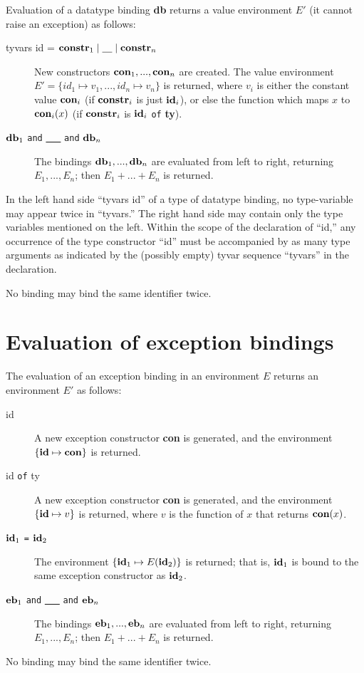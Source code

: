 Evaluation of a
datatype binding {\bf db} returns a value environment $E'$ (it cannot
raise an exception) as follows:

\begin{description}
\item[tyvars id = ${\bf constr}_1 \mid \underline{\ \ \ } \mid {\bf constr}_n$\hfill]
New constructors ${\bf con}_1, ... , {\bf con}_n$ are created.
The value environment $E' = \{ id_1 \mapsto v_1 , ... , id_n \mapsto
v_n \} $ is returned, where $v_i$ is either the constant value
${\bf con}_i$ (if ${\bf constr}_i$ is just ${\bf id}_i$), or else the
function which maps $x$ to ${\bf con}_i(x)$ (if ${\bf constr}_i$ is
${\bf id}_i$ \verb"of" {\bf ty}).

\item[${\bf db}_1$ \verb"and" \underline{\ \ \ } \verb"and" ${\bf db}_n$\hfill]
The bindings ${\bf db}_1 , ... , {\bf db}_n$
are evaluated from left to right, returning $E_1 , ... , E_n$; then
$E_1 + ... + E_n$ is returned.
\end{description}
In the left hand side ``tyvars id'' of a type of datatype binding,
no type-variable may appear twice in ``tyvars.''
The right hand side may contain only the type variables
mentioned on the left.  Within the scope of the declaration of
``id,'' any occurrence of the type constructor ``id'' must be
accompanied by as many type arguments as indicated by the (possibly empty)
tyvar sequence ``tyvars'' in the declaration.

No binding may bind the same identifier twice.
\section{Evaluation of exception bindings}
The evaluation of an exception binding in an environment $E$ returns an
environment $E'$ as follows:
\begin{description}
\item[id\hfill]   A new exception constructor {\bf con} is generated, and
the environment $\{{\bf id} \mapsto {\bf con} \}$ is returned.

\item[id \verb"of" ty \hfill]  A new exception constructor {\bf con} is generated,
and the environment $\{{\bf id} \mapsto v\}$ is returned, where $v$ is the
function of $x$ that returns ${\bf con}(x)$.

\item[${\bf id}_1$ \verb"=" ${\bf id}_2$ \hfill]  The environment
$\{ {\bf id}_1 \mapsto E({\bf id}_2) \}$ is returned; that is, 
${\bf id}_1$ is bound to the same exception constructor as ${\bf id}_2$.

\item[${\bf eb}_1$ \verb"and" \underline{\ \ \ } \verb"and" ${\bf eb}_n$\hfill]
The bindings ${\bf eb}_1 , ... , {\bf eb}_n$
are evaluated from left to right, returning $E_1 , ... , E_n$; then
$E_1 + ... + E_n$ is returned.
\end{description}
No binding may bind the same identifier twice.
